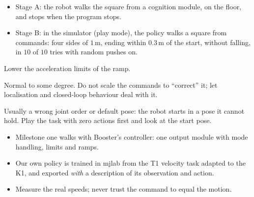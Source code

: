 \begin{checkbox}
\begin{itemize}[nosep]
  \item Stage A: the robot walks the square from a cognition module, on the floor, and stops when the program stops.
  \item Stage B: in the simulator (play mode), the policy walks a square from commands: four sides of $1$\,m, ending within $0.3$\,m of the start, without falling, in $10$ of $10$ tries with random pushes on.
\end{itemize}
\end{checkbox}

\begin{troublebox}
\begin{description}[leftmargin=0.6cm,nosep]
  \item[The robot stumbles when a command starts] Lower the acceleration limits of the ramp.
  \item[Real speed much lower than the command] Normal to some degree. Do not scale the commands to ``correct'' it; let localisation and closed-loop behaviour deal with it.
  \item[Training reward stays flat] Usually a wrong joint order or default pose: the robot starts in a pose it cannot hold. Play the task with zero actions first and look at the start pose.
\end{description}
\end{troublebox}

\begin{keyidea}
\begin{itemize}[nosep]
  \item Milestone one walks with Booster's controller: one output module with mode handling, limits and ramps.
  \item Our own policy is trained in mjlab from the T1 velocity task adapted to the K1, and exported \emph{with} a description of its observation and action.
  \item Measure the real speeds; never trust the command to equal the motion.
\end{itemize}
\end{keyidea}
